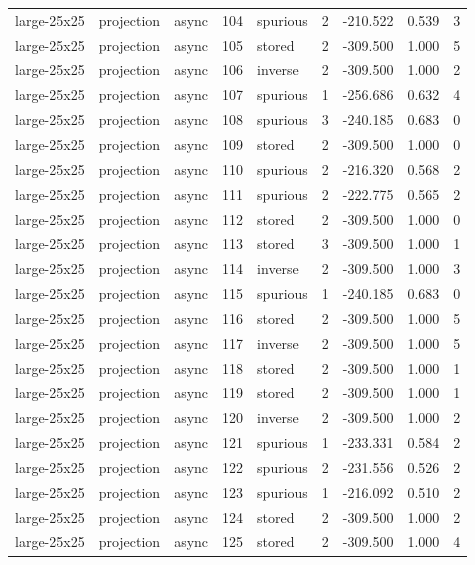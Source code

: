 \begin{tabular}{lllrlrrrr}
large-25x25 & projection & async & 104 & spurious & 2 & -210.522 & 0.539 & 3 \\
large-25x25 & projection & async & 105 & stored & 2 & -309.500 & 1.000 & 5 \\
large-25x25 & projection & async & 106 & inverse & 2 & -309.500 & 1.000 & 2 \\
large-25x25 & projection & async & 107 & spurious & 1 & -256.686 & 0.632 & 4 \\
large-25x25 & projection & async & 108 & spurious & 3 & -240.185 & 0.683 & 0 \\
large-25x25 & projection & async & 109 & stored & 2 & -309.500 & 1.000 & 0 \\
large-25x25 & projection & async & 110 & spurious & 2 & -216.320 & 0.568 & 2 \\
large-25x25 & projection & async & 111 & spurious & 2 & -222.775 & 0.565 & 2 \\
large-25x25 & projection & async & 112 & stored & 2 & -309.500 & 1.000 & 0 \\
large-25x25 & projection & async & 113 & stored & 3 & -309.500 & 1.000 & 1 \\
large-25x25 & projection & async & 114 & inverse & 2 & -309.500 & 1.000 & 3 \\
large-25x25 & projection & async & 115 & spurious & 1 & -240.185 & 0.683 & 0 \\
large-25x25 & projection & async & 116 & stored & 2 & -309.500 & 1.000 & 5 \\
large-25x25 & projection & async & 117 & inverse & 2 & -309.500 & 1.000 & 5 \\
large-25x25 & projection & async & 118 & stored & 2 & -309.500 & 1.000 & 1 \\
large-25x25 & projection & async & 119 & stored & 2 & -309.500 & 1.000 & 1 \\
large-25x25 & projection & async & 120 & inverse & 2 & -309.500 & 1.000 & 2 \\
large-25x25 & projection & async & 121 & spurious & 1 & -233.331 & 0.584 & 2 \\
large-25x25 & projection & async & 122 & spurious & 2 & -231.556 & 0.526 & 2 \\
large-25x25 & projection & async & 123 & spurious & 1 & -216.092 & 0.510 & 2 \\
large-25x25 & projection & async & 124 & stored & 2 & -309.500 & 1.000 & 2 \\
large-25x25 & projection & async & 125 & stored & 2 & -309.500 & 1.000 & 4 \\

\end{tabular}
